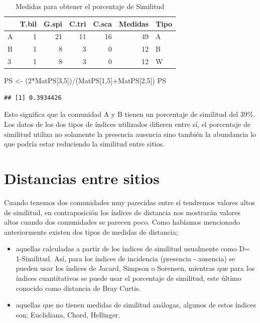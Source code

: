 \documentclass[]{book}
\newenvironment{Shaded}{\begin{snugshade}}{\end{snugshade}}
\newcommand{\DecValTok}[1]{\textcolor[rgb]{0.00,0.00,0.81}{{#1}}}
\newcommand{\StringTok}[1]{\textcolor[rgb]{0.31,0.60,0.02}{{#1}}}
\newcommand{\NormalTok}[1]{{#1}}
\begin{document}
\begin{table}[t]

\caption{\label{tab:unnamed-chunk-4}Medidas para obtener el porcentaje de Similitud}
\centering
\begin{tabular}{l|r|r|r|r|r|l}
\hline
  & T.bil & G.spi & C.tri & C.sca & Medidas & Tipo\\
\hline
A & 1 & 21 & 11 & 16 & 49 & A\\
\hline
B & 1 & 8 & 3 & 0 & 12 & B\\
\hline
3 & 1 & 8 & 3 & 0 & 12 & W\\
\hline
\end{tabular}
\end{table}

\begin{Shaded}
\begin{Highlighting}[]
\NormalTok{PS <-}\StringTok{ }\NormalTok{(}\DecValTok{2}\NormalTok{*MatPS[}\DecValTok{3}\NormalTok{,}\DecValTok{5}\NormalTok{])/(MatPS[}\DecValTok{1}\NormalTok{,}\DecValTok{5}\NormalTok{]+MatPS[}\DecValTok{2}\NormalTok{,}\DecValTok{5}\NormalTok{])}
\NormalTok{PS}
\end{Highlighting}
\end{Shaded}

\begin{verbatim}
## [1] 0.3934426
\end{verbatim}

Esto significa que la comunidad A y B tienen un porcentaje de similitud
del 39\%. Los datos de los dos tipos de índices utilizados difieren
entre sí, el porcentaje de similitud utiliza no solamente la presencia
ausencia sino también la abundancia lo que podría estar reduciendo la
similitud entre sitios.

\chapter{Distancias entre sitios}\label{distancias-entre-sitios}

Cuando tenemos dos comunidades muy parecidas entre sí tendremos valores
altos de similitud, en contraposición los índices de distancia nos
mostrarán valores altos cuando dos comunidades se parecen poco. Como
habíamos mencionado anteriormente existen dos tipos de medidas de
distancia;

\begin{itemize}
\item
  aquellas calculadas a partir de los índices de similitud usualmente
  como D= 1-Similitud. Así, para los índices de incidencia (presencia -
  ausencia) se pueden usar los índices de Jacard, Simpson o Sorensen,
  mientras que para los índices cuantitativos se puede usar el
  porcentaje de similitud, este último conocido como distancia de Bray
  Curtis.
\item
  aquellas que no tienen medidas de similitud análogas, algunos de estos
  índices son; Euclidiana, Chord, Hellinger.
\end{itemize}
\end{document}
